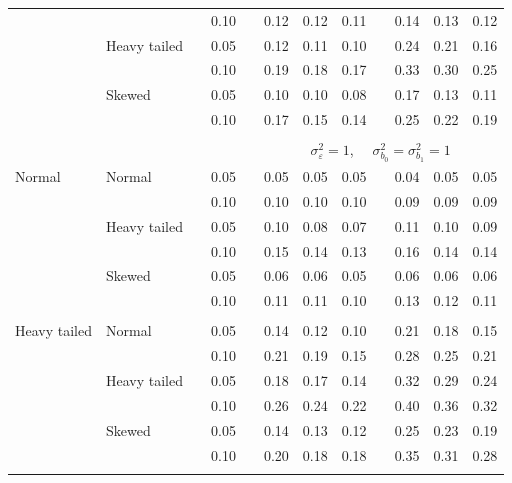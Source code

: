 \documentclass[12pt]{article} %
\begin{document}
\begin{table}[ht]
\begin{scriptsize}
\begin{center}
\begin{tabular}{ll p{.1cm} c p{.1cm} rrr p{.1cm} rrr}
             &              && 0.10 &&  0.12 & 0.12 & 0.11 && 0.14 & 0.13 & 0.12 \\ 
             & Heavy tailed && 0.05 &&  0.12 & 0.11 & 0.10 && 0.24 & 0.21 & 0.16 \\ 
             &              && 0.10 &&  0.19 & 0.18 & 0.17 && 0.33 & 0.30 & 0.25 \\ 
             & Skewed       && 0.05 &&  0.10 & 0.10 & 0.08 && 0.17 & 0.13 & 0.11 \\ 
             &              && 0.10 &&  0.17 & 0.15 & 0.14 && 0.25 & 0.22 & 0.19 \\ 

&&&&&&&&&&&\\
& && && \multicolumn{7}{c}{$\sigma_{\varepsilon}^2 = 1$, \ \ $\sigma_{b_0}^2 = \sigma_{b_1}^2 = 1$} \\ \cline{6-12}
\rowcolor{gray!20}Normal       & Normal       && 0.05 &&  0.05 & 0.05 & 0.05 && 0.04 & 0.05 & 0.05 \\ 
\rowcolor{gray!20}             &              && 0.10 &&  0.10 & 0.10 & 0.10 && 0.09 & 0.09 & 0.09 \\ 
\rowcolor{gray!20}             & Heavy tailed && 0.05 &&  0.10 & 0.08 & 0.07 && 0.11 & 0.10 & 0.09 \\ 
\rowcolor{gray!20}             &              && 0.10 &&  0.15 & 0.14 & 0.13 && 0.16 & 0.14 & 0.14 \\ 
\rowcolor{gray!20}             & Skewed       && 0.05 &&  0.06 & 0.06 & 0.05 && 0.06 & 0.06 & 0.06 \\ 
\rowcolor{gray!20}             &              && 0.10 &&  0.11 & 0.11 & 0.10 && 0.13 & 0.12 & 0.11 \\ 
             &&&&&&&&&&&\\
Heavy tailed & Normal       && 0.05 &&  0.14 & 0.12 & 0.10 && 0.21 & 0.18 & 0.15 \\ 
             &              && 0.10 &&  0.21 & 0.19 & 0.15 && 0.28 & 0.25 & 0.21 \\ 
             & Heavy tailed && 0.05 &&  0.18 & 0.17 & 0.14 && 0.32 & 0.29 & 0.24 \\ 
             &              && 0.10 &&  0.26 & 0.24 & 0.22 && 0.40 & 0.36 & 0.32 \\ 
             & Skewed       && 0.05 &&  0.14 & 0.13 & 0.12 && 0.25 & 0.23 & 0.19 \\ 
             &              && 0.10 &&  0.20 & 0.18 & 0.18 && 0.35 & 0.31 & 0.28 \\ 
             &&&&&&&&&&&\\

\end{tabular}
\end{center}
\end{scriptsize}
\end{table}
\end{document}
